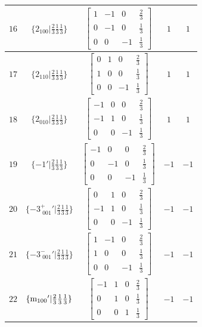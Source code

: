 \documentclass[fleqn,8pt]{jsarticle}
\begin{document}
\begin{longtable}{ccccc}
$ 16 $ & $ \{2{}_{100}|\frac{2}{3} \frac{1}{3} \frac{1}{3}\} $ & $ \begin{bmatrix} 1 & -1 & 0 & \frac{2}{3} \\ 0 & -1 & 0 & \frac{1}{3} \\ 0 & 0 & -1 & \frac{1}{3} \end{bmatrix} $ & $ 1 $ & $ 1 $ \\ \hline
$ 17 $ & $ \{2{}_{110}|\frac{2}{3} \frac{1}{3} \frac{1}{3}\} $ & $ \begin{bmatrix} 0 & 1 & 0 & \frac{2}{3} \\ 1 & 0 & 0 & \frac{1}{3} \\ 0 & 0 & -1 & \frac{1}{3} \end{bmatrix} $ & $ 1 $ & $ 1 $ \\ \hline
$ 18 $ & $ \{2{}_{010}|\frac{2}{3} \frac{1}{3} \frac{1}{3}\} $ & $ \begin{bmatrix} -1 & 0 & 0 & \frac{2}{3} \\ -1 & 1 & 0 & \frac{1}{3} \\ 0 & 0 & -1 & \frac{1}{3} \end{bmatrix} $ & $ 1 $ & $ 1 $ \\ \hline
$ 19 $ & $ \{-1{}'|\frac{2}{3} \frac{1}{3} \frac{1}{3}\} $ & $ \begin{bmatrix} -1 & 0 & 0 & \frac{2}{3} \\ 0 & -1 & 0 & \frac{1}{3} \\ 0 & 0 & -1 & \frac{1}{3} \end{bmatrix} $ & $ -1 $ & $ -1 $ \\ \hline
$ 20 $ & $ \{-3^{+}_{\,\,001}{}'|\frac{2}{3} \frac{1}{3} \frac{1}{3}\} $ & $ \begin{bmatrix} 0 & 1 & 0 & \frac{2}{3} \\ -1 & 1 & 0 & \frac{1}{3} \\ 0 & 0 & -1 & \frac{1}{3} \end{bmatrix} $ & $ -1 $ & $ -1 $ \\ \hline
$ 21 $ & $ \{-3^{-}_{\,\,001}{}'|\frac{2}{3} \frac{1}{3} \frac{1}{3}\} $ & $ \begin{bmatrix} 1 & -1 & 0 & \frac{2}{3} \\ 1 & 0 & 0 & \frac{1}{3} \\ 0 & 0 & -1 & \frac{1}{3} \end{bmatrix} $ & $ -1 $ & $ -1 $ \\ \hline
$ 22 $ & $ \{{\rm m}_{100}{}'|\frac{2}{3} \frac{1}{3} \frac{1}{3}\} $ & $ \begin{bmatrix} -1 & 1 & 0 & \frac{2}{3} \\ 0 & 1 & 0 & \frac{1}{3} \\ 0 & 0 & 1 & \frac{1}{3} \end{bmatrix} $ & $ -1 $ & $ -1 $ \\ \hline

\end{longtable}
\end{document}
